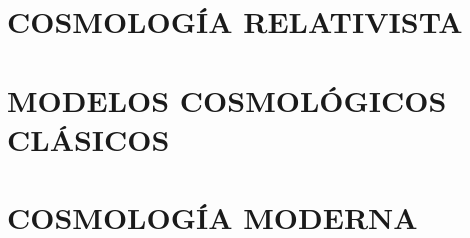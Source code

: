 \documentclass[../main]{subfiles}
\begin{document}

\chapter{COSMOLOGÍA RELATIVISTA}

\newpage


\chapter{MODELOS COSMOLÓGICOS CLÁSICOS}

\newpage


\chapter{COSMOLOGÍA MODERNA}

\newpage
\end{document}
